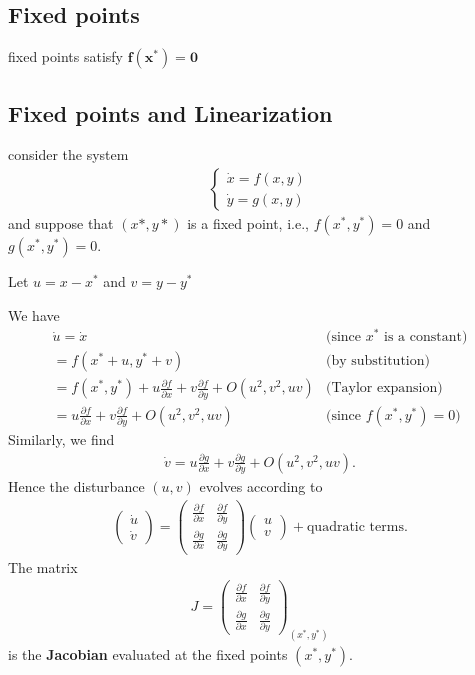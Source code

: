 \subsection{Fixed points}

fixed points satisfy $\mathbf{f(x^*)}=\mathbf{0}$
\subsection{Fixed points and Linearization}
consider the system
\begin{eqnarray}
	\begin{cases}
		\dot x= f(x,y)
		\\
		\dot y= g(x,y)
	\end{cases}
\end{eqnarray}
and suppose that $(x*,y*)$ is a fixed point, i.e.,	$f(x^*,y^*)=0$ and $g(x^*,y^*)=0$.

Let	$u = x - x^*$ and $v= y -y^*$

We have
\begin{eqnarray}
	\dot u = \dot x &\text{(since $x^*$ is a constant)}
	\\
	=f(x^*+u, y^* + v) &\text{(by substitution)}
	\\
	=f(x^*,y^*)
		+u\frac{\partial f}{\partial x}
		+v\frac{\partial f}{\partial y}
		+O(u^2,v^2, uv) &\text{(Taylor expansion)}
		\\
	=u\frac{\partial f}{\partial x}
		+v\frac{\partial f}{\partial y}
		+O(u^2,v^2, uv) &\text{(since $f(x^*, y^*)=0$)}
\end{eqnarray}
Similarly, we find
\begin{eqnarray}
	\dot v=u\frac{\partial g}{\partial x}
		+v\frac{\partial g}{\partial y}
		+O(u^2,v^2, uv).
\end{eqnarray}
Hence the disturbance $(u, v)$ evolves according to
\begin{eqnarray}
	\label{eq:NonLinearSysJaco}
	\begin{pmatrix}
		\dot u
		\\
		\dot v
	\end{pmatrix}
	=
	\begin{pmatrix}
		\frac{\partial f}{\partial x} & \frac{\partial f}{\partial y}
		\\
		\frac{\partial g}{\partial x} & \frac{\partial g}{\partial y}
	\end{pmatrix}
	\begin{pmatrix}
		u
		\\
		v
	\end{pmatrix}
	+
	\text{quadratic terms}.
\end{eqnarray}
The matrix
\begin{eqnarray}
	J=
	\begin{pmatrix}
		\frac{\partial f}{\partial x} & \frac{\partial f}{\partial y}
		\\
		\frac{\partial g}{\partial x} & \frac{\partial g}{\partial y}
	\end{pmatrix}_{(x^*,y^*)}
\end{eqnarray}
is the \textbf{Jacobian} evaluated at the fixed points $(x^*,y^*)$.
\\


